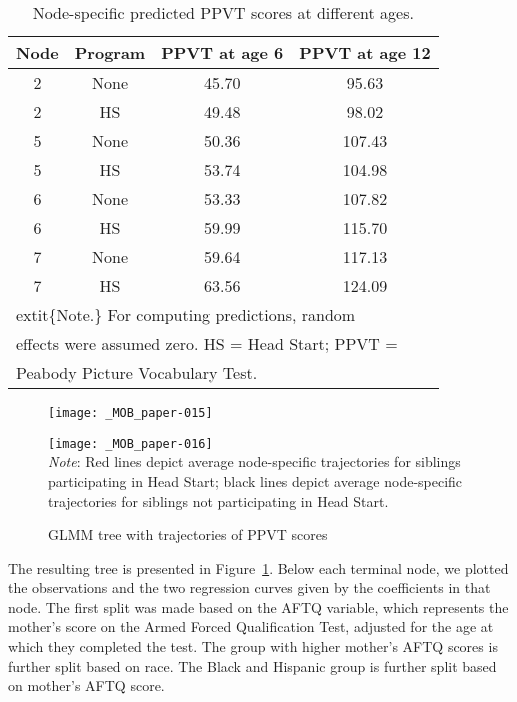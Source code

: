 \documentclass[doc,floatsintext,natbib]{apa7}
\begin{document}
\begin{table}

\caption{\label{tab:predictions}Node-specific predicted PPVT scores at different ages.}
\begin{tabular}[t]{cccc}
\toprule
Node & Program & PPVT at age 6 & PPVT at age 12\\
\midrule
2 & None & 45.70 & 95.63\\
2 & HS & 49.48 & 98.02\\
5 & None & 50.36 & 107.43\\
5 & HS & 53.74 & 104.98\\
6 & None & 53.33 & 107.82\\
6 & HS & 59.99 & 115.70\\
7 & None & 59.64 & 117.13\\
7 & HS & 63.56 & 124.09\\
\bottomrule
\multicolumn{4}{l}{\textsuperscript{} extit\{Note.\} For computing predictions, random}\\
\multicolumn{4}{l}{effects were assumed zero. HS = Head Start; PPVT =}\\
\multicolumn{4}{l}{Peabody Picture Vocabulary Test.}\\
\end{tabular}
\end{table}
\FloatBarrier

\begin{figure}%
\caption{GLMM tree with trajectories of PPVT scores}
\texttt{[image: \_MOB\_paper-015]}

\vspace*{-3cm}

\texttt{[image: \_MOB\_paper-016]}
\\\textit{Note}: Red lines depict average node-specific trajectories for siblings participating in Head Start; black lines depict average node-specific trajectories for siblings not participating in Head Start.
\label{fig:lmm_tree}
\end{figure}%

The resulting tree is presented in Figure~\ref{fig:lmm_tree}. Below each terminal node, we plotted the observations and the two regression curves given by the coefficients in that node. The first split was made based on the AFTQ variable, which represents the mother's score on the Armed Forced Qualification Test, adjusted for the age at which they completed the test. The group with higher mother's AFTQ scores is further split based on race. The Black and Hispanic group is further split based on mother's AFTQ score. 
\end{document}
